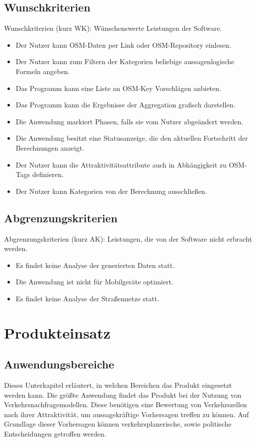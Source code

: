\documentclass[parskip=full]{scrartcl} %
\begin{document}
\newpage

\subsection{Wunschkriterien}
Wunschkriterien (kurz WK): Wünschenswerte Leistungen der Software.
\begin{itemize}
    \item <WK1> Der Nutzer kann OSM-Daten per Link oder OSM-Repository einlesen.
    \item <WK2> Der Nutzer kann zum Filtern der Kategorien beliebige aussagenlogische Formeln angeben.
    \item <WK3> Das Programm kann eine Liste an OSM-Key Vorschlägen anbieten.
    \item <WK4> Das Programm kann die Ergebnisse der Aggregation grafisch darstellen.
    \item <WK5> Die Anwendung markiert Phasen, falls sie vom Nutzer abgeändert werden.
    \item <WK6> Die Anwendung besitzt eine Statusanzeige, die den aktuellen Fortschritt der Berechnungen anzeigt.
    \item <WK7> Der Nutzer kann die Attraktivitätsattribute auch in Abhängigkeit zu OSM-Tags definieren.
    \item <WK8> Der Nutzer kann Kategorien von der Berechnung ausschließen.
    
\end{itemize}

\subsection{Abgrenzungskriterien}
Abgrenzungskriterien (kurz AK): Leistungen, die von der Software nicht erbracht werden.
\begin{itemize}
    \item <AK1> Es findet keine Analyse der generierten Daten statt.
    \item <AK2> Die Anwendung ist nicht für Mobilgeräte optimiert.
    \item <AK3> Es findet keine Analyse der Straßennetze statt.
\end{itemize}
\newpage

\section{Produkteinsatz}

\subsection{Anwendungsbereiche}
Dieses Unterkapitel erläutert, in welchen Bereichen das Produkt eingesetzt werden kann. Die größte Anwendung findet das Produkt bei der Nutzung von Verkehrsnachfragemodellen. Diese benötigen eine Bewertung von Verkehrszellen nach ihrer Attraktivität, um aussagekräftige Vorhersagen treffen zu können. Auf Grundlage dieser Vorhersagen können verkehrsplanerische, sowie politische Entscheidungen getroffen werden.
\end{document}
